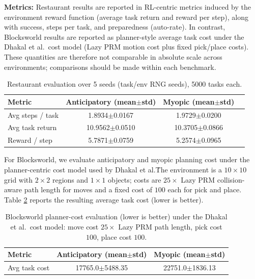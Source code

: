 \documentclass{article}
\begin{document}
\noindent\textbf{Metrics:}
Restaurant results are reported in RL-centric metrics induced by the environment reward function (average task return and reward per step), along with success, steps per task, and preparedness (auto-rate). In contrast, Blocksworld results are reported as planner-style average task cost under the Dhakal et al.\ cost model (Lazy PRM motion cost plus fixed pick/place costs). These quantities are therefore not comparable in absolute scale across environments; comparisons should be made within each benchmark.

\begin{table}[t]
\centering
\small
\begin{tabular}{lccc}
\toprule
Metric & Anticipatory (mean$\pm$std) & Myopic (mean$\pm$std)  \\
\midrule
Avg steps / task & 1.8934$\pm$0.0167 & 1.9729$\pm$0.0200  \\
Avg task return & 10.9562$\pm$0.0510 & 10.3705$\pm$0.0866  \\
Reward / step & 5.7871$\pm$0.0759 & 5.2574$\pm$0.0965  \\
\bottomrule
\end{tabular}
\caption{Restaurant evaluation over 5 seeds (task/env RNG seeds), 5000 tasks each.}
\label{tab:restaurant_multiseed}
\end{table}

For Blocksworld, we evaluate anticipatory and myopic planning cost under the planner-centric cost model used by Dhakal et al.\. The environment is a $10 \times 10$ grid with $2 \times 2$ regions and $1 \times 1$ objects; costs are $25 \times$ Lazy PRM collision-aware path length for moves and a fixed cost of $100$ each for pick and place. Table \ref{tab:blocksworld_cost} reports the resulting average task cost (lower is better).

\begin{table}[t]
\centering
\small
\begin{tabular}{lcc}
\toprule
Metric & Anticipatory (mean$\pm$std) & Myopic (mean$\pm$std) \\
\midrule
Avg task cost & 17765.0$\pm$5488.35 & 22751.0$\pm$1836.13 \\
\bottomrule
\end{tabular}
\caption{Blocksworld planner-cost evaluation (lower is better) under the Dhakal et al.\ cost model: move cost $25\times$ Lazy PRM path length, pick cost $100$, place cost $100$.}
\label{tab:blocksworld_cost}
\end{table}
\end{document}
